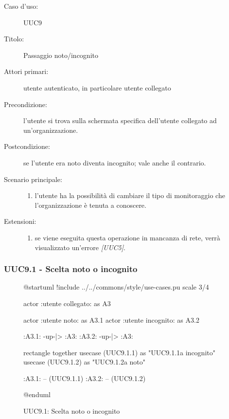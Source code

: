 \documentclass[../analisi-dei-requisiti.tex]{subfiles}
\begin{document}
\begin{description}
  \item[Caso d’uso:] UUC9
  \item[Titolo:] Passaggio noto/incognito
  \item[Attori primari:] utente autenticato, in particolare utente collegato
  \item[Precondizione:] l'utente si trova sulla schermata specifica dell'utente collegato ad un'organizzazione.
  \item[Postcondizione:] se l'utente era noto diventa incognito; vale anche il contrario.
  \item[Scenario principale:]
        \begin{enumerate}
          \item l'utente ha la possibilità di cambiare il tipo di monitoraggio che l'organizzazione è tenuta a conoscere.
        \end{enumerate}
  \item[Estensioni:]
        \begin{enumerate}
          \item se viene eseguita questa operazione in mancanza di rete, verrà visualizzato un'errore \emph{[UUC5]}.
        \end{enumerate}
\end{description}

\subsubsection{UUC9.1 - Scelta noto o incognito}%
\label{subsub:UUC9.1utente}

\begin{figure}[h!]
  \centering
  \begin{plantuml}
  @startuml
  !include ../../commons/style/use-cases.pu
  scale 3/4

  actor :utente collegato: as A3

  actor :utente noto: as A3.1
  actor :utente incognito: as A3.2

  :A3.1: -up-|> :A3:
  :A3.2: -up-|> :A3:

  rectangle {
    together {
      usecase (UUC9.1.1) as "UUC9.1.1\nPassaggio a incognito"
      usecase (UUC9.1.2) as "UUC9.1.2\nPassaggio a noto"
    }
  }

  :A3.1: -- (UUC9.1.1)
  :A3.2: -- (UUC9.1.2)

  @enduml
  \end{plantuml}
  \caption{UUC9.1: Scelta noto o incognito}
  \label{fig:uuc9_1}
\end{figure}
\end{document}
